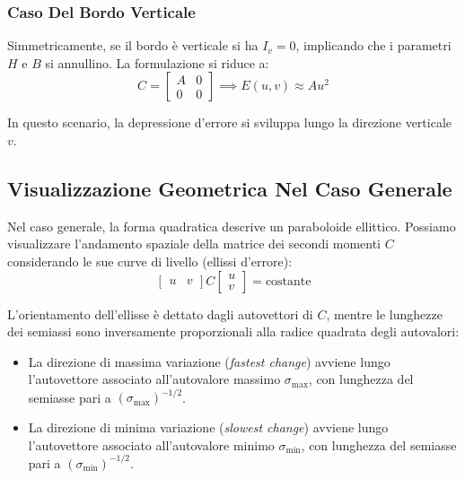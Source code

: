 ﻿\documentclass[11pt, a4paper]{article}
\begin{document}
\subsubsection{Caso Del Bordo Verticale}
Simmetricamente, se il bordo è verticale si ha $I_v = 0$, implicando che i parametri $H$ e $B$ si annullino. La formulazione si riduce a:
\begin{equation}
    C = \begin{bmatrix} A & 0 \\ 0 & 0 \end{bmatrix} \implies E(u,v) \approx A u^2
\end{equation}


In questo scenario, la depressione d'errore si sviluppa lungo la direzione verticale $v$.

\subsection{Visualizzazione Geometrica Nel Caso Generale}

Nel caso generale, la forma quadratica descrive un paraboloide ellittico. Possiamo visualizzare l'andamento spaziale della matrice dei secondi momenti $C$ considerando le sue curve di livello (ellissi d'errore):
\begin{equation}
    \begin{bmatrix} u & v \end{bmatrix} C \begin{bmatrix} u \\ v \end{bmatrix} = \text{costante}
\end{equation}


L'orientamento dell'ellisse è dettato dagli autovettori di $C$, mentre le lunghezze dei semiassi sono inversamente proporzionali alla radice quadrata degli autovalori:
\begin{itemize}[noitemsep]
    \item La direzione di massima variazione (\emph{fastest change}) avviene lungo l'autovettore associato all'autovalore massimo $\sigma_{\max}$, con lunghezza del semiasse pari a $(\sigma_{\max})^{-1/2}$.
    \item La direzione di minima variazione (\emph{slowest change}) avviene lungo l'autovettore associato all'autovalore minimo $\sigma_{\min}$, con lunghezza del semiasse pari a $(\sigma_{\min})^{-1/2}$.
\end{itemize}
\end{document}
